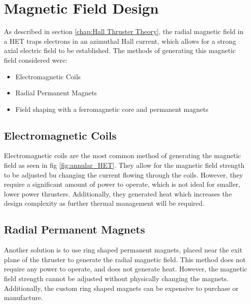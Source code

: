 \section{Magnetic Field Design}

As described in section \ref{chap:Hall Thruster Theory}, the radial magnetic field in a \ac{HET} traps electrons in an azimuthal Hall current, which allows for a strong axial electric field to be established. The methods of generating this magnetic field considered were:

\begin{itemize}
    \item Electromagnetic Coils
    \item Radial Permanent Magnets
    \item Field shaping with a ferromagnetic core and permanent magnets
\end{itemize}

\subsection{Electromagnetic Coils}

Electromagnetic coils are the most common method of generating the magnetic field as seen in fig \ref{fig:annular_HET}. They allow for the magnetic field strength to be adjusted bu changing the current flowing through the coils. However, they require a significant amount of power to operate, which is not ideal for smaller, lower power thrusters. Additionally, they generated heat which increases the design complexity as further thermal management will be required.

\subsection{Radial Permanent Magnets}
Another solution is to use ring shaped permanent magnets, placed near the exit plane of the thruster to generate the radial magnetic field. This method does not require any power to operate, and does not generate heat. However, the magnetic field strength cannot be adjusted without physically changing the magnets. Additionally, the custom ring shaped magnets can be expensive to purchase or manufacture.

